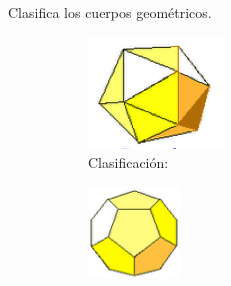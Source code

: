 \question[10] Clasifica los cuerpos geométricos.
\begin{figure}[H]
    \centering
    \begin{subfigure}{.18\linewidth}
        \centering
        \includegraphics[width=\linewidth]{../images/sinma2_aiu3_ac79_img01}
        \caption{Clasificación:\\\fillin[poliedro][1.6cm]}
        \label{sfig:sinma2_aiu3_ac79_img01}
    \end{subfigure}\qquad
    \begin{subfigure}{.18\linewidth}
        \centering
        \includegraphics[width=\linewidth]{../images/sinma2_aiu3_ac79_img02}

\end{subfigure}
\end{figure}

